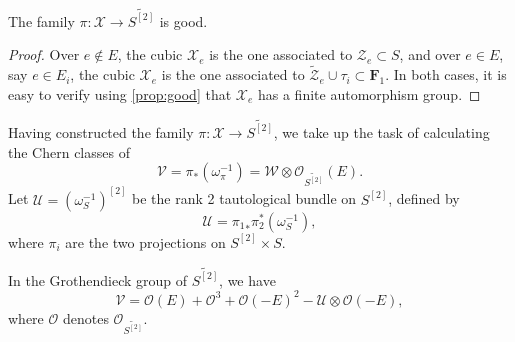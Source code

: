\documentclass[11pt,reqno, letterpaper]{amsart}
\renewcommand{\to}{{\longrightarrow}}
\numberwithin{equation}{section}
\renewcommand{\O}{\mathcal O}
\newcommand{\F}{\mathbf F}
\newcommand{\td}{\widetilde}
\begin{document}
\begin{proposition}
  \label{prop:good4} The family $\pi: \mathcal{X} \to \td{S^{[2]}}$ is
  good.
\end{proposition}
\begin{proof}
  Over $e \not \in E$, the cubic $\mathcal X_e$ is the one associated to $\mathcal Z_e \subset S$, and over $e \in E$, say $e \in E_i$, the cubic $\mathcal X_e$ is the one associated to $\widetilde {\mathcal Z}_e \cup \tau_i \subset \F_1$.
  In both cases, it is easy to verify using \autoref{prop:good} that $\mathcal X_e$ has a finite automorphism group.
\end{proof}

Having constructed the family $\pi \colon \mathcal X \to \widetilde{S^{[2]}}$, we take up the task of calculating the Chern classes of
\[ \mathcal V = \pi_* \left(\omega_\pi^{-1}\right) = \mathcal W \otimes \O_{\widetilde{S^{[2]}}}(E).\]
Let $\mathcal U = \left(\omega_S^{-1}\right)^{[2]}$ be the rank 2 tautological bundle on $S^{[2]}$, defined by
\[ \mathcal U = {\pi_1}_*\pi_2^* \left(\omega_S^{-1}\right),\]
where $\pi_i$ are the two projections on $S^{[2]} \times S$.
\begin{proposition}\label{prop:v4groth}
  In the Grothendieck group of $\widetilde {S^{[2]}}$, we have
  \[
    \mathcal V =  \O(E) + \O^3 + \O(-E)^2 - \mathcal U \otimes \O(-E),
  \]
  where $\O$ denotes $\O_{\widetilde{S^[2]}}$.
\end{proposition}
\end{document}

